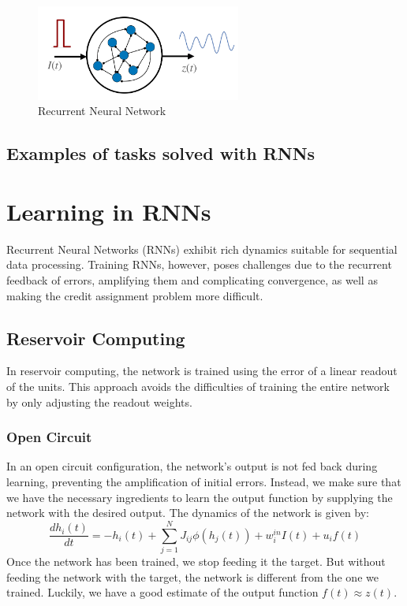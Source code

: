 \documentclass[11pt]{book} %
\begin{document}
\begin{figure}
    \centering
    \includegraphics[width=0.6\textwidth]{Figs/RNN.jpeg}
    \caption{Recurrent Neural Network}
    \label{fig:rnn}
\end{figure}

\subsection{Examples of tasks solved with RNNs}

\section{Learning in RNNs}

Recurrent Neural Networks (RNNs) exhibit rich dynamics suitable for sequential data processing. Training RNNs, however, poses challenges due to the recurrent feedback of errors, amplifying them and complicating convergence, as well as making the credit assignment problem more difficult.

\subsection{Reservoir Computing}
In reservoir computing, the network is trained using the error of a linear readout of the units. This approach avoids the difficulties of training the entire network by only adjusting the readout weights.

\subsubsection{Open Circuit}
In an open circuit configuration, the network's output is not fed back during learning, preventing the amplification of initial errors. 
Instead, we make sure that we have the necessary ingredients to learn the output function by supplying the network with the desired output.
The dynamics of the network is given by:
\[
    \frac{dh_i(t)}{dt} = -h_i(t) + \sum_{j=1}^N J_{ij} \phi(h_j(t)) + w_i^{in} I(t) + u_i f(t)
\]
Once the network has been trained, we stop feeding it the target.
But without feeding the network with the target, the network is different from the one we trained.
Luckily, we have a good estimate of the output function $f(t) \approx z(t)$.
\end{document}
